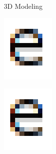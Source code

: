 \documentclass{lug}
\newcommand{\splitslide}[4]{
    \noindent
    \begin{minipage}{#1 \textwidth - #2 }
        #3
    \end{minipage}%
    \hspace{ \dimexpr #2 * 2 \relax }%
    \begin{minipage}{\textwidth - #1 \textwidth - #2 }
        #4
    \end{minipage}
}
\begin{document}
\begin{frame}{3D Modeling}
    \splitslide{0.5}{.2em}{
        \includegraphics[width=\textwidth]{graphics/subpixel_e}
    }{
        \includegraphics[width=\textwidth]{graphics/subpixel_e}
    }
\end{frame}
\end{document}
